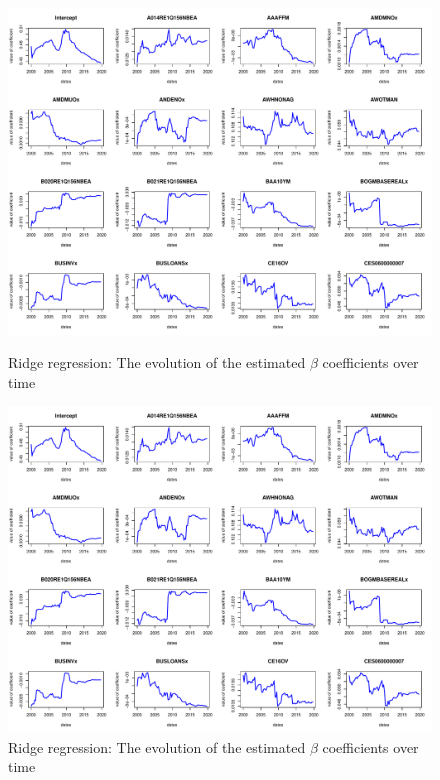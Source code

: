 \documentclass{article}
\begin{document}
\begin{subfigures}
\begin{figure}[hbt!]
\includegraphics[page = 9, width=\textwidth]{plots/ridge_betas}
\label{fig:ridge_betas}
\caption{\label{ninth}Ridge regression: The evolution of the estimated $\beta$ coefficients over time}
\centering
\end{figure}

\begin{figure}[hbt!]
\includegraphics[page = 10, width=\textwidth]{plots/ridge_betas}
\caption{\label{tenth}Ridge regression: The evolution of the estimated $\beta$ coefficients over time}
\label{fig:ridge_betas}
\centering
\end{figure}


\end{subfigures}
\end{document}
